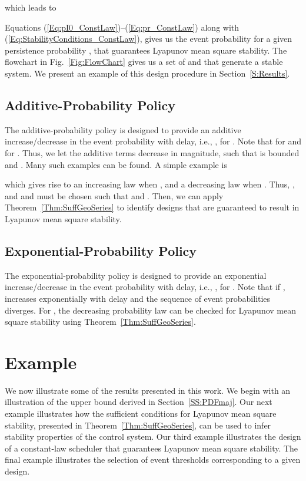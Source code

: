 \documentclass[twocolumn]{autart}
\begin{document}
which leads to


Equations (\ref{Eq:pI0_ConstLaw})--(\ref{Eq:pr_ConstLaw}) along with (\ref{Eq:StabilityConditions_ConstLaw}), gives us the event probability  for a given persistence probability , that guarantees Lyapunov mean square stability. The flowchart in Fig.~\ref{Fig:FlowChart} gives us a set of  and  that generate a stable system. We present an example of this design procedure in Section~\ref{S:Results}.



\subsection{Additive-Probability Policy}
The additive-probability policy is designed to provide an additive increase/decrease in the event probability with delay, i.e., , for . Note that  for  and  for . Thus, we let the additive terms decrease in magnitude, such that  is bounded and . Many such examples can be found. A simple example is

which gives rise to an increasing law when , and a decreasing law when . Thus, , and  and  must be chosen such that  and . Then, we can apply Theorem~\ref{Thm:SuffGeoSeries} to identify designs that are guaranteed to result in Lyapunov mean square stability.

\subsection{Exponential-Probability Policy}
The exponential-probability policy is designed to provide an exponential increase/decrease in the event probability with delay, i.e., , for . Note that if ,  increases exponentially with delay and the sequence of event probabilities  diverges. For , the decreasing probability law can be checked for Lyapunov mean square stability using Theorem~\ref{Thm:SuffGeoSeries}.

\section{Example} \label{S:Sim}

We now illustrate some of the results presented in this work. We begin with an illustration of the upper bound derived in Section~\ref{SS:PDFmaj}. Our next example illustrates how the sufficient conditions for Lyapunov mean square stability, presented in Theorem~\ref{Thm:SuffGeoSeries}, can be used to infer stability properties of the control system. Our third example illustrates the design of a constant-law scheduler that guarantees Lyapunov mean square stability. The final example illustrates the selection of event thresholds corresponding to a given design.
\end{document}
